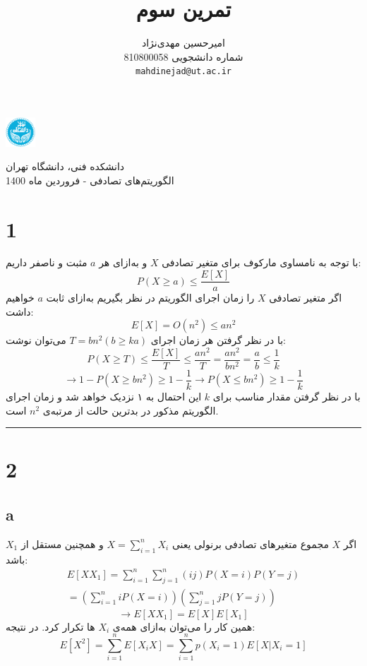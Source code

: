 \documentclass{article}
\title{
تمرین سوم
}
\author{%
  امیرحسین مهدی‌نژاد\\
  شماره دانشجویی 810800058\\
  \texttt{mahdinejad@ut.ac.ir} \\
}
\begin{document}
\begin{minipage}{0.1\textwidth}%
\includegraphics[width=1.1cm]{Photos/UT_logo.png}
\end{minipage}%
\hfill%
\begin{minipage}{0.9\textwidth}\raggedleft
دانشکده فنی، دانشگاه تهران\\
الگوریتم‌های تصادفی -  
فروردین
ماه 1400\\
\end{minipage}

\makepertitle

\section*{1}
با توجه به نامساوی مارکوف برای متغیر تصادفی
$X$
و به‌ازای هر
$a$
مثبت و ناصفر داریم:
$$P( X\geq a) \leq \dfrac{E\left[ X\right] }{a}$$
اگر متغیر تصادفی
$X$
را زمان اجرای الگوریتم در نظر بگیریم به‌ازای ثابت
$a$
خواهیم داشت:
$$E\left[ X\right] =O\left( n^{2}\right) \leq an^{2}$$
با در نظر گرفتن هر زمان اجرای
$T=bn^2 (b\geq ka)$
می‌توان نوشت:
$$P( X\geq T) \leq \dfrac{E\left[ X\right] }{T}\leq \dfrac{an^{2}}{T}=\dfrac{an^{2}}{bn^{2}}=\dfrac{a}{b}\leq \frac{1}{k}$$
$$\rightarrow 1-P( X\geq bn^{2}) \geq 1-\dfrac{1}{k}\rightarrow P\left( X\leq bn^{2}\right) \geq 1-\dfrac{1}{k}$$
با در نظر گرفتن مقدار مناسب برای
$k$
این احتمال به ۱ نزدیک خواهد شد و زمان اجرای الگوریتم مذکور در بدترین حالت از مرتبه‌ی 
$n^2$
است.

\rule{\linewidth}{1pt}

\section*{2}
\subsection*{a}
اگر 
$X$
مجموع متغیر‌های تصادفی برنولی یعنی
$X=\sum ^{n}_{i=1}X_{i}$
و همچنین مستقل از
$X_1$
باشد:
$$\begin{aligned}E\left[ XX_{1}\right] =\sum ^{n}_{i=1}\sum ^{n}_{j=1}\left( ij\right) P\left( X=i\right) P\left( Y=j\right) \\ =\left( \sum ^{n}_{i=1}iP\left( X=i\right) \right) \left( \sum ^{n}_{j=1}jP\left( Y=j\right) \right) \end{aligned}$$
$$\rightarrow E\left[ XX_{1}\right] =E\left[ X\right] E\left[ X_{1}\right]$$
همین کار را می‌توان به‌ازای همه‌ی
$X_i$
ها تکرار کرد. در نتیجه:
$$E\left[ X^{2}\right] =\sum ^{n}_{i=1}E\left[ X_{i}X\right] =\sum ^{n}_{i=1}p( X_{i}= 1) E[ X| X_{i}= 1]$$
\end{document}
